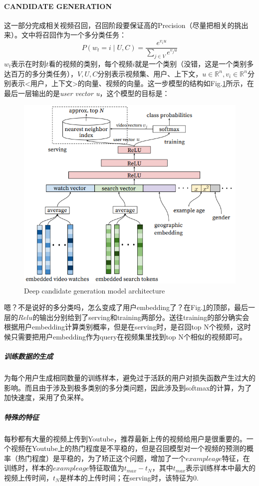 \paragraph{CANDIDATE GENERATION}
这一部分完成相关视频召回，召回阶段要保证高的Precision（尽量把相关的挑出来）。文中将召回作为一个多分类任务：
$$
P\left(w_{t}=i \mid U, C\right)=\frac{e^{v_{i} u}}{\sum_{j \in V} e^{v_{j} u}}
$$
$w_t$表示在时刻$t$看的视频的类别，每个视频$i$就是一个类别（没错，这是一个类别多达百万的多分类任务），$V, U, C$分别表示视频集、用户、上下文，$u \in \mathbb{R}^n, v_i \in \mathbb{R}^n$分别表示<用户，上下文>的向量、视频的向量。这一步模型的结构如Fig.\ref{fig:can_gen}所示，在最后一层输出的是\textit{user vector u}，这个模型的目标是：

\begin{figure}[h]
	\centering
	\includegraphics[width=.8\textwidth]{pics/candidate generation.png}
	\caption{Deep candidate generation model architecture}
	\label{fig:can_gen}
\end{figure}
嗯？不是说好的多分类吗，怎么变成了用户embedding了？在Fig.\ref{fig:can_gen}的顶部，最后一层的$Relu$的输出分别给到了serving和training两部分。送往training的部分确实会根据用户embedding计算类别概率，但是在serving时，是召回top N个视频，这时候只需要把用户embedding作为query在视频集里找到top N个相似的视频即可。

\subparagraph{训练数据的生成}为每个用户生成相同数量的训练样本，避免过于活跃的用户对损失函数产生过大的影响。而且由于涉及到极多类别的多分类问题，因此涉及到softmax的计算，为了加快速度，采用了负采样。

\subparagraph{特殊的特征}每秒都有大量的视频上传到Youtube，推荐最新上传的视频给用户是很重要的。一个视频在Youtube上的热门程度是不平稳的，但是召回模型对一个视频的预测的概率（热门程度）是平稳的，为了矫正这个问题，增加了一个$example age$特征，在训练时，样本的$example age$特征取值为$t_{max} - t_N$，其中$t_{max}$表示训练样本中最大的视频上传时间，$t_N$是样本的上传时间；在serving时，该特征为0.

